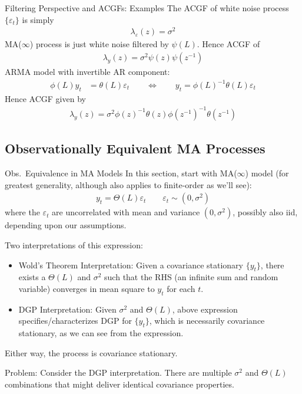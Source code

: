 \documentclass[aspectratio=169, handout]{beamer}
\begin{document}
{\footnotesize
\begin{frame}{Filtering Perspective and ACGFs: Examples}
The ACGF of white noise process $\{\varepsilon_t\}$ is simply
\begin{align*}
  \lambda_\varepsilon(z) = \sigma^2
\end{align*}
\pause
MA($\infty$) process is just white noise filtered by $\psi(L)$.
Hence ACGF of
\begin{align*}
  \lambda_y(z) = \sigma^2 \psi(z)\psi(z^{-1})
\end{align*}
\pause
ARMA model with invertible AR component:
\begin{align*}
  \phi(L)y_t
  &=
  \theta(L)\varepsilon_t
  \qquad\iff\qquad
  y_t
  =
  \phi(L)^{-1}\theta(L)\varepsilon_t
\end{align*}
\pause
Hence ACGF given by
\begin{align*}
  \lambda_y(z)
  =
  \sigma^2
  \phi(z)^{-1}\theta(z)
  \phi(z^{-1})^{-1}\theta(z^{-1})
\end{align*}
\end{frame}
}


\subsection{Observationally Equivalent MA Processes}

{\scriptsize
\begin{frame}{Obs.\ Equivalence in MA Models}
In this section, start with MA($\infty$) model (for greatest generality,
although also applies to finite-order as we'll see):
\begin{align}
  y_t = \Theta(L)\varepsilon_t
  \qquad
  \varepsilon_t\sim (0,\sigma^2)
\end{align}
where the $\varepsilon_t$ are uncorrelated with mean and variance
$(0,\sigma^2)$, possibly also iid, depending upon our assumptions.

\pause
Two interpretations of this expression:
\begin{itemize}
  \item \alert{Wold's Theorem Interpretation}:
    Given a covariance stationary $\{y_t\}$, there exists a $\Theta(L)$
    and $\sigma^2$ such that the RHS (an infinite sum and random
    variable) converges in mean square to $y_t$ for each $t$.

  \item \alert{DGP Interpretation}:
    Given $\sigma^2$ and $\Theta(L)$, above expression
    specifies/characterizes DGP for $\{y_t\}$, which
    is necessarily covariance stationary, as we can see from the
    expression.
\end{itemize}
Either way, the process is covariance stationary.

\pause
\alert{Problem}:
Consider the DGP interpretation.
There are multiple $\sigma^2$ and $\Theta(L)$ combinations that might
deliver \alert{identical} covariance properties.
\end{frame}
}
\end{document}
